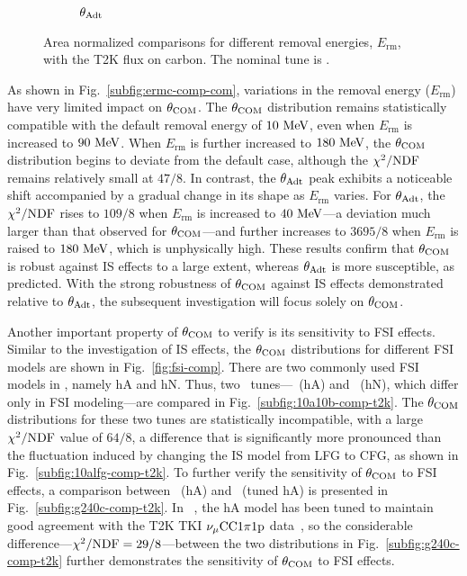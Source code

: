 \begin{figure}[ht!]
\begin{subfigure}[ht!]{\dbfigwid\textwidth}
          \caption{$\theta_{\textrm{Adt}}$}
          \label{subfig:ermc-comp-adt}
     \end{subfigure}
     \caption{Area normalized comparisons for different removal energies, $E_{\textrm{rm}}$, with the T2K flux on carbon. The nominal tune is \gZero.}
     \label{fig:ermc-comp}
     \end{figure}
     As shown in Fig.~\ref{subfig:ermc-comp-com}, variations in the removal energy ($E_{\textrm{rm}}$) have very limited impact on $\theta_{\textrm{COM}}$. 
     The $\theta_{\textrm{COM}}$ distribution remains statistically compatible with the default removal energy of $10~\textrm{MeV}$, even when $E_{\textrm{rm}}$ is increased to $90~\textrm{MeV}$.
     When $E_{\textrm{rm}}$ is further increased to $180~\textrm{MeV}$, the $\theta_{\textrm{COM}}$ distribution begins to deviate from the default case, although the $\chi^2/{\textrm{NDF}}$ remains relatively small at $47/8$.
     In contrast, the $\theta_{\textrm{Adt}}$ peak exhibits a noticeable shift accompanied by a gradual change in its shape as $E_{\textrm{rm}}$ varies.
     For $\theta_{\textrm{Adt}}$, the $\chi^2/{\textrm{NDF}}$ rises to $109/8$ when $E_{\textrm{rm}}$ is increased to $40~\textrm{MeV}$—a deviation much larger than that observed for $\theta_{\textrm{COM}}$—and further increases to $3695/8$ when $E_{\textrm{rm}}$ is raised to $180~\textrm{MeV}$, which is unphysically high.
     These results confirm that $\theta_{\textrm{COM}}$ is robust against IS effects to a large extent, whereas $\theta_{\textrm{Adt}}$ is more susceptible, as predicted.
     With the strong robustness of $\theta_{\textrm{COM}}$ against IS effects demonstrated relative to $\theta_{\textrm{Adt}}$, the subsequent investigation will focus solely on $\theta_{\textrm{COM}}$.

     Another important property of $\theta_{\textrm{COM}}$ to verify is its sensitivity to FSI effects.
     Similar to the investigation of IS effects, the $\theta_{\textrm{COM}}$ distributions for different FSI models are shown in Fig.~\ref{fig:fsi-comp}.
     There are two commonly used FSI models in \genie, namely hA and hN.
     Thus, two \genie\ tunes—\geta\ (hA) and \getb\ (hN), which differ only in FSI modeling—are compared in Fig.~\ref{subfig:10a10b-comp-t2k}.
     The $\theta_{\textrm{COM}}$ distributions for these two tunes are statistically incompatible, with a large $\chi^2/{\textrm{NDF}}$ value of $64/8$, a difference that is significantly more pronounced than the fluctuation induced by changing the IS model from LFG to CFG, as shown in Fig.~\ref{subfig:10alfg-comp-t2k}.
     To further verify the sensitivity of $\theta_{\textrm{COM}}$ to FSI effects, a comparison between \gZero\ (hA) and \gC\ (tuned hA) is presented in Fig.~\ref{subfig:g240c-comp-t2k}.
     In \gC~\cite{GENIE:2024ufm}, the hA model has been tuned to maintain good agreement with the T2K TKI $\nu_{\mu}\textrm{CC}1\pi1\textrm{p}$ data~\cite{T2K:2021naz}, so the considerable difference—$\chi^2/{\textrm{NDF}}=29/8$—between the two distributions in Fig.~\ref{subfig:g240c-comp-t2k} further demonstrates the sensitivity of $\theta_{\textrm{COM}}$ to FSI effects.

